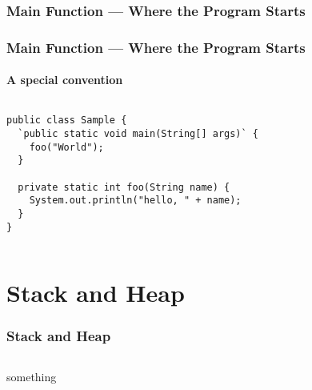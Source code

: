 \documentclass[en, 11pt, xcolor=dvipsnames]{beamer}
\begin{document}
\subsubsection{Main Function --- Where the Program Starts}
\begin{frame}[fragile]
	\frametitle{Main Function --- Where the Program Starts}
	\framesubtitle{A special convention}



	\begin{columns}[c]
		\begin{column}{0.9\textwidth}

			\begin{lstlisting}[style=Java]
public class Sample {
  `public static void main(String[] args)` {
    foo("World");
  }

  private static int foo(String name) {
    System.out.println("hello, " + name);
  }
}
\end{lstlisting}

		\end{column}
	\end{columns}

\end{frame}


\section{Stack and Heap}
\begin{frame}[fragile]
	\frametitle{Stack and Heap}

	\begin{columns}[c]
		\begin{column}{0.9\textwidth}
			something

		\end{column}
	\end{columns}
\end{frame}
\end{document}
